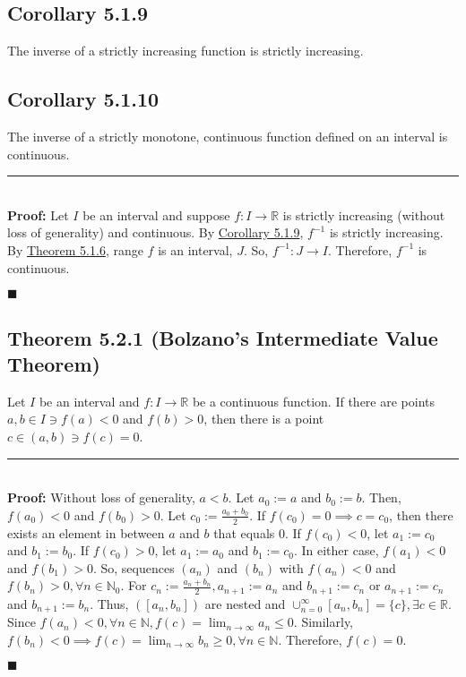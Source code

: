 \documentclass[11pt]{book}
\newcommand{\R}{\mathbb{R}}
\newcommand{\N}{\mathbb{N}}
\newcommand{\horline}{\noindent\rule{14.25cm}{0.6pt}\\}
\newcommand{\QED}{\begin{flushright}$\blacksquare$\end{flushright}}
\begin{document}
	\subsection{Corollary 5.1.9}
	\label{subsec:cor519}
		\begin{cor}
			The inverse of a strictly increasing function is strictly increasing.
		\end{cor}

	\subsection{Corollary 5.1.10}
	\label{subsec:cor5110}
		\begin{cor}
			The inverse of a strictly monotone, continuous function defined on an interval is continuous.\hfill\break
			\horline
			\textbf{Proof:} Let $I$ be an interval and suppose $f:I \to \R$ is strictly increasing (without loss of generality) and continuous. 
			By \hyperref[subsec:cor519]{Corollary 5.1.9}, $f^{-1}$ is strictly increasing. By \hyperref[subsec:theor516]{Theorem 5.1.6}, range ${f}$ is
			an interval, $J$. So, $f^{-1}:J \to I$. Therefore, $f^{-1}$ is continuous.\QED
		\end{cor}
	\newpage

	\subsection{Theorem 5.2.1 (Bolzano's Intermediate Value Theorem)}
	\label{subsec:theor521}
		\begin{theor}
			Let $I$ be an interval and $f: I \to \R$ be a continuous function. If there are points $a,b \in I \ni f(a) < 0$ and $f(b) > 0$, then there is a point
			$c \in (a,b) \ni f(c) = 0$. \hfill\break
			\horline
			\textbf{Proof:} Without loss of generality, $a < b$. Let $a_0 := a$ and $b_0 := b$. Then, $f(a_0) < 0$ and $f(b_0) > 0$. Let $c_0 := \frac{a_0+b_0}{2}$.
			If $f(c_0) = 0 \implies c = c_0$, then there exists an element in between $a$ and $b$ that equals $0$. If $f(c_0) < 0$, let $a_1 := c_0$ and 
			$b_1 := b_0$. If $f(c_0) > 0$, let $a_1 := a_0$ and $b_1 := c_0$. In either case, $f(a_1) < 0$ and $f(b_1) > 0$. So, sequences $(a_n)$ and
			$(b_n)$ with $f(a_n) < 0$ and $f(b_n) > 0, \forall n \in \N_0$. For $c_n := \frac{a_n + b_n}{2}, a_{n+1} := a_n$ and $b_{n+1} := c_n$ or
			$a_{n+1} := c_n$ and $b_{n+1} := b_n$. Thus, $([a_n,b_n])$ are nested and $\displaystyle\cup_{n = 0}^{\infty}{[a_n,b_n]} = \{c\}, \exists c \in \R$.
			Since $f(a_n) < 0, \forall n \in \N, f(c) = \displaystyle\lim_{n \to \infty}{a_n \leq 0}$. Similarly, $f(b_n) < 0 \implies f(c) = \displaystyle\lim_{n \to \infty}{b_n \geq 0 }, \forall n \in \N$. Therefore, $f(c) = 0$. \QED

		\end{theor}
\end{document}
